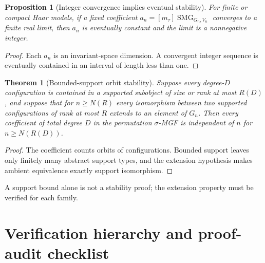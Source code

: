 \documentclass[10pt]{article}
\newcommand{\SMG}{\operatorname{SMG}}
\newcommand{\MGF}{\SMG}
\newtheorem{theorem}{Theorem}
\newtheorem{proposition}{Proposition}
\begin{document}
\begin{proposition}[Integer convergence implies eventual stability]
For finite or compact Haar models, if a fixed coefficient
$a_n=[m_\tau]\MGF_{G_n,V_n}$ converges to a finite real limit, then $a_n$ is
eventually constant and the limit is a nonnegative integer.
\end{proposition}
\begin{proof}
Each $a_n$ is an invariant-space dimension. A convergent integer sequence is
eventually contained in an interval of length less than one.
\end{proof}

\begin{theorem}[Bounded-support orbit stability]\label{thm:bounded-support-orbit-stability}
Suppose every degree-$D$ configuration is contained in a supported subobject
of size or rank at most $R(D)$, and suppose that for $n\ge N(R)$ every
isomorphism between two supported configurations of rank at most $R$ extends
to an element of $G_n$. Then every coefficient of total degree $D$ in the
permutation $\sigma$-MGF is independent of $n$ for
$n\ge N(R(D))$.
\end{theorem}
\begin{proof}
The coefficient counts orbits of configurations. Bounded support leaves only
finitely many abstract support types, and the extension hypothesis makes
ambient equivalence exactly support isomorphism.
\end{proof}
A support bound alone is not a stability proof; the extension property must be
verified for each family.

\section{Verification hierarchy and proof-audit checklist}
\end{document}
